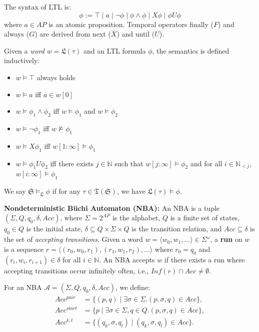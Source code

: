 The syntax of LTL is:
\[
\phi := \top \mid a \mid \lnot \phi \mid \phi \land \phi \mid X \phi \mid \phi U \phi
\]
where $a \in AP$ is an atomic proposition. Temporal operators finally ($F$) and always ($G$) are derived from next ($X$) and until ($U$).

Given a \emph{word} $w = \mathfrak{L}(\tau)$ and an LTL formula $\phi$, the semantics is defined inductively:
\begin{itemize}
    \item \(w \models \top \) always holds
    \item \(w \models a\)  iff  \(a \in w[0]\)
    \item \(w \models \phi_1 \land \phi_2\)  iff  \(w \models \phi_1\) and \(w \models \phi_2\)
    \item \(w \models \lnot \phi_1\)  iff  \(w \not\models \phi_1\)
    \item \(w \models X \phi_1\)  iff  \(w[1:\infty] \models \phi_1\)
    \item \(w \models \phi_1 U \phi_2\)  iff  there exists \(j \in \mathbb{N}\) such that \(w[j:\infty] \models \phi_2\) and for all \(i \in \mathbb{N}_{<j}\), \(w[i:\infty] \models \phi_1\)
\end{itemize}
We say $\mathfrak{S} \models_{\mathfrak{L}} \phi$ if for any $\tau \in \mathfrak{T}(\mathfrak{S})$, we have $\mathfrak{L}(\tau) \models \phi$.

\textbf{Nondeterministic Büchi Automaton (NBA):} An NBA is a tuple $(\Sigma, Q, q_0, \delta, Acc)$, where $\Sigma = 2^{AP}$ is the alphabet, $Q$ is a finite set of states, $q_0 \in Q$ is the initial state, $\delta \subseteq Q \times \Sigma \times Q$ is the transition relation, and $Acc \subseteq \delta$ is the set of \emph{accepting transitions}. Given a word $w = \langle w_0, w_1, \ldots \rangle \in \Sigma^{\omega}$, a \textbf{run} on $w$ is a sequence $r = \langle (r_0, w_0, r_1), (r_1, w_1, r_2), \ldots \rangle$ where $r_0 = q_0$ and $(r_i, w_i, r_{i+1}) \in \delta$ for all $i \in \mathbb{N}$. An NBA accepts $w$ if there exists a run where accepting transitions occur infinitely often, i.e., $\mathit{Inf}(r) \cap Acc \neq \emptyset$.

For an NBA $\mathcal{A} = (\Sigma, Q, q_0, \delta, Acc)$, we define:
\begin{align}
  Acc^{pair} &= \{(p, q) \mid \exists \sigma \in \Sigma. (p, \sigma, q) \in Acc \}, \label{atpair}\\
  Acc^{start} &= \{p \mid \exists \sigma \in \Sigma, q \in Q. (p, \sigma, q) \in Acc \}, \label{atstart}\\
  Acc^{k, l} &= \{(q_k, \sigma, q_l) \mid (q_k, \sigma, q_l) \in Acc \}. \label{atkl}
\end{align}


